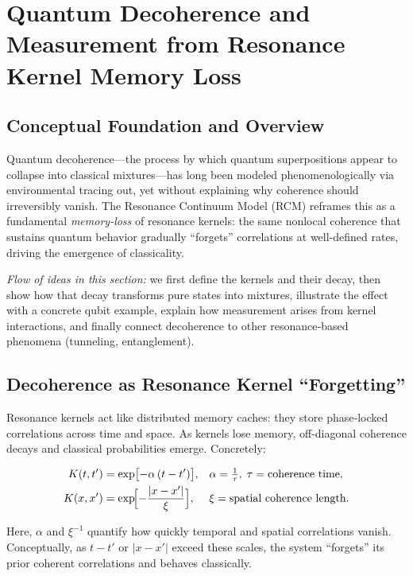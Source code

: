 \section{Quantum Decoherence and Measurement from Resonance Kernel Memory Loss}

\subsection{Conceptual Foundation and Overview}

Quantum decoherence—the process by which quantum superpositions appear to collapse into classical mixtures—has long been modeled phenomenologically via environmental tracing out, yet without explaining why coherence should irreversibly vanish.  The Resonance Continuum Model (RCM) reframes this as a fundamental \emph{memory‐loss} of resonance kernels: the same nonlocal coherence that sustains quantum behavior gradually “forgets” correlations at well‐defined rates, driving the emergence of classicality.

\emph{Flow of ideas in this section:} we first define the kernels and their decay, then show how that decay transforms pure states into mixtures, illustrate the effect with a concrete qubit example, explain how measurement arises from kernel interactions, and finally connect decoherence to other resonance‐based phenomena (tunneling, entanglement).

\subsection{Decoherence as Resonance Kernel “Forgetting”}

Resonance kernels act like distributed memory caches: they store phase‐locked correlations across time and space.  As kernels lose memory, off‐diagonal coherence decays and classical probabilities emerge.  Concretely:

\begin{align}
K(t,t') &= \exp\bigl[-\alpha\,(t - t')\bigr], && \alpha = \tfrac{1}{\tau},\; \tau=\text{coherence time},\label{eq:time_kernel}\\
K(x,x') &= \exp\!\Bigl[-\frac{|x - x'|}{\xi}\Bigr], && \xi=\text{spatial coherence length}.\label{eq:space_kernel}
\end{align}

Here, $\alpha$ and $\xi^{-1}$ quantify how quickly temporal and spatial correlations vanish.  Conceptually, as $t-t'$ or $|x-x'|$ exceed these scales, the system “forgets” its prior coherent correlations and behaves classically.

